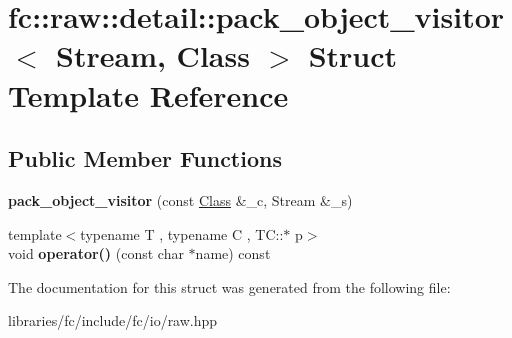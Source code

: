 \hypertarget{structfc_1_1raw_1_1detail_1_1pack__object__visitor}{}\section{fc\+:\+:raw\+:\+:detail\+:\+:pack\+\_\+object\+\_\+visitor$<$ Stream, Class $>$ Struct Template Reference}
\label{structfc_1_1raw_1_1detail_1_1pack__object__visitor}
\subsection*{Public Member Functions}
\begin{DoxyCompactItemize}
\item 
\mbox{\label{structfc_1_1raw_1_1detail_1_1pack__object__visitor_ad74c8ed4d7c1c12a1d240432e9eaf309}} 
{\bfseries pack\+\_\+object\+\_\+visitor} (const \mbox{\hyperlink{class_class}{Class}} \&\+\_\+c, Stream \&\+\_\+s)
\item 
\mbox{\label{structfc_1_1raw_1_1detail_1_1pack__object__visitor_ab0b97edab0ba6c9263397d8a84c48671}} 
{\footnotesize template$<$typename T , typename C , T\+C\+::$\ast$ p$>$ }\\void {\bfseries operator()} (const char $\ast$name) const
\end{DoxyCompactItemize}


The documentation for this struct was generated from the following file\+:\begin{DoxyCompactItemize}
\item 
libraries/fc/include/fc/io/raw.\+hpp\end{DoxyCompactItemize}
